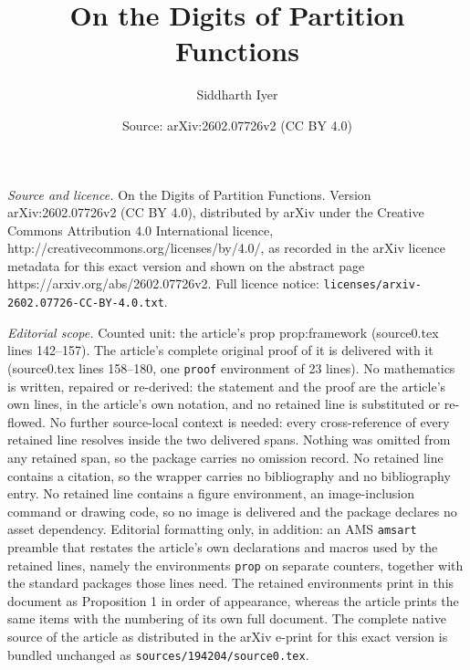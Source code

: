 \documentclass[10pt,a4paper]{amsart}
\title{On the Digits of Partition Functions}
\author{Siddharth Iyer}
\date{Source: arXiv:2602.07726v2 (CC BY 4.0)}
\begin{document}
\maketitle

\noindent\emph{Source and licence.} On the Digits of Partition Functions. Version arXiv:2602.07726v2 (CC BY 4.0), distributed by arXiv under the Creative Commons Attribution 4.0 International licence, http://creativecommons.org/licenses/by/4.0/, as recorded in the arXiv licence metadata for this exact version and shown on the abstract page https://arxiv.org/abs/2602.07726v2. Full licence notice: \texttt{licenses/arxiv-2602.07726-CC-BY-4.0.txt}.\par\smallskip

\noindent\textit{Editorial scope.} Counted unit: the article's prop prop:framework (source0.tex lines 142--157). The article's complete original proof of it is delivered with it (source0.tex lines 158--180, one \texttt{proof} environment of 23 lines). No mathematics is written, repaired or re-derived: the statement and the proof are the article's own lines, in the article's own notation, and no retained line is substituted or re-flowed.  No further source-local context is needed: every cross-reference of every retained line resolves inside the two delivered spans.  Nothing was omitted from any retained span, so the package carries no omission record.  No retained line contains a citation, so the wrapper carries no bibliography and no bibliography entry.  No retained line contains a figure environment, an image-inclusion command or drawing code, so no image is delivered and the package declares no asset dependency.  Editorial formatting only, in addition: an AMS \texttt{amsart} preamble that restates the article's own declarations and macros used by the retained lines, namely the environments \texttt{prop} on separate counters, together with the standard packages those lines need.  The retained environments print in this document as Proposition 1 in order of appearance, whereas the article prints the same items with the numbering of its own full document.  The complete native source of the article as distributed in the arXiv e-print for this exact version is bundled unchanged as \texttt{sources/194204/source0.tex}.
\end{document}
